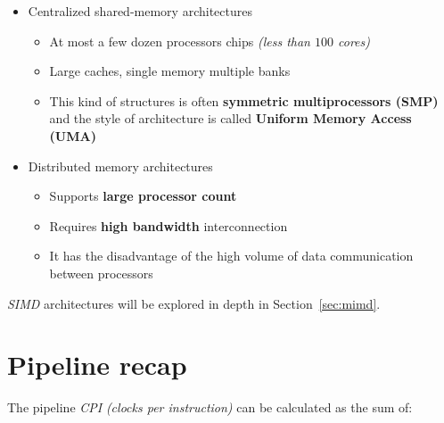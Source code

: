\documentclass[english]{article}
\begin{document}
\begin{itemize}
  \item Centralized shared-memory architectures
        \begin{itemize}
          \item At most a few dozen processors chips \textit{(less than \(100\) cores)}
          \item Large caches, single memory multiple banks
          \item This kind of structures is often \textbf{symmetric multiprocessors (SMP)} and the style of architecture is called \textbf{Uniform Memory Access (UMA)}
        \end{itemize}
  \item Distributed memory architectures
        \begin{itemize}
          \item Supports \textbf{large processor count}
          \item Requires \textbf{high bandwidth} interconnection
          \item It has the disadvantage of the high volume of data communication between processors
        \end{itemize}
\end{itemize}

\bigskip
\textit{SIMD} architectures will be explored in depth in Section~\ref{sec:mimd}.

\clearpage

\section{Pipeline recap}

The pipeline \textit{CPI} \textit{(clocks per instruction)} can be calculated as the sum of:
\end{document}
